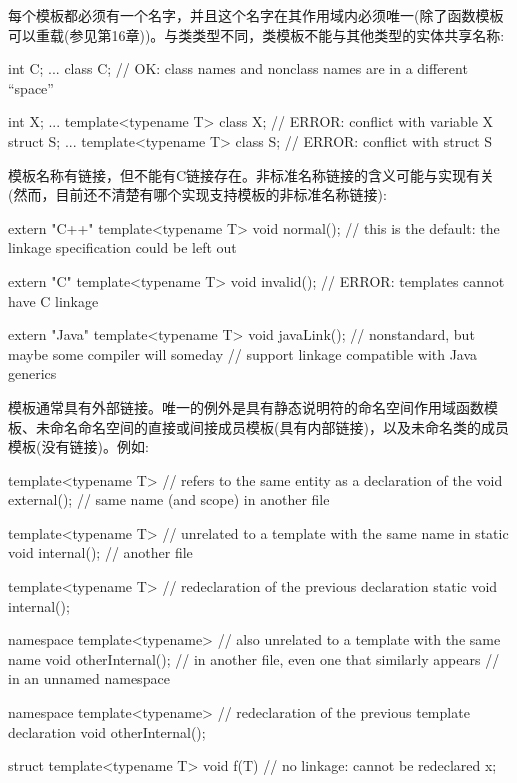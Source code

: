 每个模板都必须有一个名字，并且这个名字在其作用域内必须唯一(除了函数模板可以重载(参见第16章))。与类类型不同，类模板不能与其他类型的实体共享名称:

\begin{cpp}
int C;
...
class C; // OK: class names and nonclass names are in a different “space”

int X;
...
template<typename T>
class X; // ERROR: conflict with variable X
struct S;
...
template<typename T>
class S; // ERROR: conflict with struct S
\end{cpp}

模板名称有链接，但不能有C链接存在。非标准名称链接的含义可能与实现有关(然而，目前还不清楚有哪个实现支持模板的非标准名称链接):

\begin{cpp}
extern "C++" template<typename T>
void normal(); // this is the default: the linkage specification could be left out

extern "C" template<typename T>
void invalid(); // ERROR: templates cannot have C linkage

extern "Java" template<typename T>
void javaLink(); // nonstandard, but maybe some compiler will someday
				// support linkage compatible with Java generics
\end{cpp}

模板通常具有外部链接。唯一的例外是具有静态说明符的命名空间作用域函数模板、未命名命名空间的直接或间接成员模板(具有内部链接)，以及未命名类的成员模板(没有链接)。例如:

\begin{cpp}
template<typename T> // refers to the same entity as a declaration of the
void external(); // same name (and scope) in another file

template<typename T> // unrelated to a template with the same name in
static void internal(); // another file

template<typename T> // redeclaration of the previous declaration
static void internal();

namespace {
	template<typename> // also unrelated to a template with the same name
	void otherInternal(); // in another file, even one that similarly appears
} // in an unnamed namespace

namespace {
	template<typename> // redeclaration of the previous template declaration
	void otherInternal();
}

struct {
	template<typename T> void f(T) {} // no linkage: cannot be redeclared
} x;
\end{cpp}

